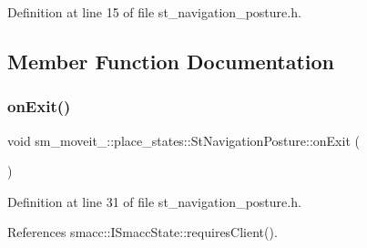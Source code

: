 Definition at line 15 of file st\+\_\+navigation\+\_\+posture.\+h.



\subsection{Member Function Documentation}
\mbox{\label{structsm__moveit__4_1_1place__states_1_1StNavigationPosture_a1e0072ec1475de6876feebc591a0acce}} 
\subsubsection{\texorpdfstring{on\+Exit()}{onExit()}}
{\footnotesize\ttfamily void sm\+\_\+moveit\+\_\+::place\+\_\+states\+::\+St\+Navigation\+Posture\+::on\+Exit (\begin{DoxyParamCaption}{ }\end{DoxyParamCaption})\hspace{0.3cm}{\ttfamily [inline]}}



Definition at line 31 of file st\+\_\+navigation\+\_\+posture.\+h.



References smacc\+::\+I\+Smacc\+State\+::requires\+Client().


